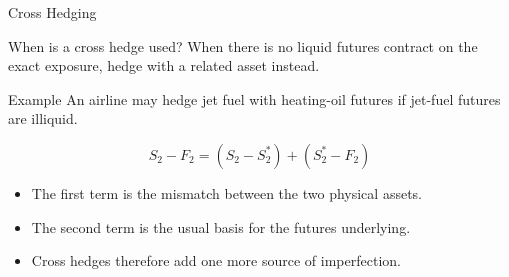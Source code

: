 \documentclass[aspectratio=169,11pt]{beamer}
\begin{document}
\begin{frame}{Cross Hedging}
    \begin{block}{When is a cross hedge used?}
        When there is no liquid futures contract on the exact exposure, hedge with a related asset instead.
    \end{block}

    \begin{exampleblock}{Example}
        An airline may hedge jet fuel with heating-oil futures if jet-fuel futures are illiquid.
    \end{exampleblock}

    \[
        S_2-F_2=(S_2-S_2^*)+(S_2^*-F_2)
    \]

    \begin{itemize}
        \item The first term is the mismatch between the two physical assets.
        \item The second term is the usual basis for the futures underlying.
        \item Cross hedges therefore add one more source of imperfection.
    \end{itemize}
\end{frame}
\end{document}
